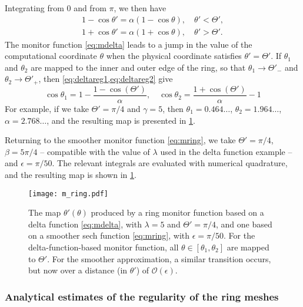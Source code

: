 \documentclass[11pt, a4paper]{scrartcl}  %
\theoremstyle{plain}
\theoremstyle{definition}
\numberwithin{equation}{section}
\begin{document}
Integrating from 0 and from $\pi$, we then have
\begin{align}
\label{eq:deltareg1}
1 - \cos\theta' = \alpha (1 - \cos\theta), \quad \theta' < \Theta', \\
\label{eq:deltareg2}
1 + \cos\theta' = \alpha (1 + \cos\theta), \quad \theta' > \Theta'.
\end{align}
The monitor function \cref{eq:mdelta} leads to a jump in the value of the
computational coordinate $\theta$ when the physical coordinate satisfies
$\theta' = \Theta'$. If $\theta_1$ and $\theta_2$ are mapped to the
inner and outer edge of the ring, so that $\theta_1 \to \Theta'_-$ and
$\theta_2 \to \Theta'_+$, then \cref{eq:deltareg1,eq:deltareg2} give
\begin{equation}
\cos\theta_1 = 1 - \frac{1 - \cos(\Theta')}{\alpha}, \quad
\cos\theta_2 = \frac{1 + \cos(\Theta')}{\alpha} - 1
\end{equation}
For example, if we take $\Theta' = \pi/4$ and $\gamma = 5$, then
$\theta_1 = 0.464\ldots$, $\theta_2 = 1.964\ldots$, $\alpha = 2.768\ldots$,
and the resulting map is presented in \cref{fig:m_ring}.

Returning to the smoother monitor function \cref{eq:mring}, we take
$\Theta' = \pi/4$, $\beta = 5\pi/4$ -- compatible with the value of
$\lambda$ used in the delta function example -- and $\epsilon = \pi/50$.
The relevant integrals are evaluated with numerical quadrature, and the
resulting map is shown in \cref{fig:m_ring}.

\begin{figure}[!tb]
  \centering
  \texttt{[image: m\_ring.pdf]}
  \caption{The map $\theta'(\theta)$ produced by a ring monitor function
based on a delta function \cref{eq:mdelta}, with ${\lambda = 5}$ and
${\Theta' = \pi/4}$, and one based on a smoother sech function
\cref{eq:mring}, with ${\epsilon = \pi/50}$. For the
delta-function-based monitor function, all
$\theta \in [\theta_1, \theta_2]$ are mapped to $\Theta'$. For the
smoother approximation, a similar transition occurs, but now over a
distance (in $\theta'$) of $\mathcal{O}(\epsilon)$.}
\label{fig:m_ring}
\end{figure}

\subsubsection{Analytical estimates of the regularity of the ring meshes}
\end{document}
